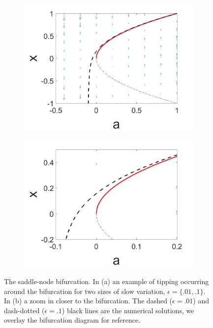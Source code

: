 \begin{figure}[H]
\centering
\begin{subfigure}{.5\textwidth}
 \centering
 \includegraphics[width=\linewidth]{intro/saddlenode_tipping.jpg}
 \caption{}
\end{subfigure}%
\begin{subfigure}{.5\textwidth}
 \centering
 \includegraphics[width=\linewidth]{intro/saddlenode_tipping_zoom.jpg}
 \caption{}
\end{subfigure}
\caption{The saddle-node bifurcation. In (a) an example of tipping occurring around the bifurcation for two sizes of slow variation, $\epsilon=\{.01,.1\}$. In (b) a zoom in closer to the bifurcation. The dashed ($\epsilon = .01$) and dash-dotted ($\epsilon=.1$) black lines are the numerical solutions, we overlay the bifurcation diagram for reference.}
\label{fig:intro_tipping}
\end{figure}


